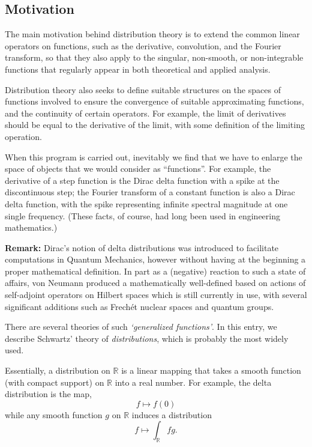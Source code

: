 \documentclass[12pt]{article}
\newcommand{\sR}[0]{\mathbb{R}}
\begin{document}
\newcommand{\cD}[0]{\mathcal{D}}
\newcommand{\scomp}[0]{C^\infty_0}

\subsection*{Motivation}

The main motivation behind distribution theory is to
extend the common linear operators on functions,
such as the derivative, convolution, and the Fourier transform,
so that they also apply to the singular, non-smooth, or non-integrable
functions that regularly appear in both theoretical and applied 
analysis.

Distribution theory also seeks to define suitable structures
on the spaces of functions involved
to ensure the convergence of suitable approximating functions,
and the continuity of certain operators.
For example, the limit of derivatives should be equal
to the derivative of the limit, with some definition of the limiting
operation.

When this program is carried out,
inevitably we find that we have to enlarge the space of objects that we
would consider as ``functions''.  For example, the derivative of a step
function is the Dirac delta function with a spike at the discontinuous step;
the Fourier transform of a constant function is also a Dirac delta
function, with the spike representing infinite spectral magnitude
at one single frequency.  (These facts, of course, had long been 
used in engineering mathematics.)

\textbf{Remark:}
Dirac's notion of delta distributions was introduced to facilitate computations in Quantum Mechanics,
however without having at the beginning a proper mathematical definition. In part as 
a (negative) reaction to such a state of affairs, von Neumann produced a mathematically
well-defined  based on actions of 
self-adjoint operators on Hilbert spaces which is still currently in use, with several significant
additions such as Frech\'et nuclear spaces and quantum groups. 

There are several theories of such \emph{`generalized functions'}.
In this entry, we describe Schwartz' theory of \emph{distributions}, 
which is probably the most widely used.

Essentially, a distribution on $\sR$ is a linear mapping that takes a 
smooth function (with compact support) on $\sR$ into a real number. 
For example, the delta distribution is the map,
$$
    f\mapsto f(0)
$$
while any smooth function $g$ on $\sR$ induces a distribution
$$
   f\mapsto \int_{\sR} fg.
$$
\end{document}
